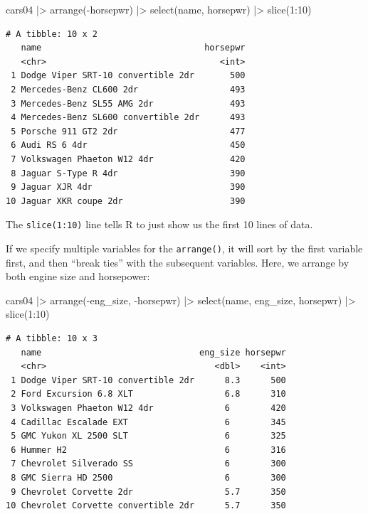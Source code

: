 \documentclass[
  letterpaper,
]{book}
\newenvironment{Shaded}{\begin{snugshade}}{\end{snugshade}}
\newcommand{\DecValTok}[1]{\textcolor[rgb]{0.68,0.00,0.00}{#1}}
\newcommand{\FunctionTok}[1]{\textcolor[rgb]{0.28,0.35,0.67}{#1}}
\newcommand{\NormalTok}[1]{\textcolor[rgb]{0.00,0.23,0.31}{#1}}
\newcommand{\SpecialCharTok}[1]{\textcolor[rgb]{0.37,0.37,0.37}{#1}}
\begin{document}
\begin{Shaded}
\begin{Highlighting}[]
\NormalTok{cars04 }\SpecialCharTok{|\textgreater{}} 
  \FunctionTok{arrange}\NormalTok{(}\SpecialCharTok{{-}}\NormalTok{horsepwr) }\SpecialCharTok{|\textgreater{}} 
  \FunctionTok{select}\NormalTok{(name, }
\NormalTok{         horsepwr) }\SpecialCharTok{|\textgreater{}} 
  \FunctionTok{slice}\NormalTok{(}\DecValTok{1}\SpecialCharTok{:}\DecValTok{10}\NormalTok{)}
\end{Highlighting}
\end{Shaded}

\begin{verbatim}
# A tibble: 10 x 2
   name                                horsepwr
   <chr>                                  <int>
 1 Dodge Viper SRT-10 convertible 2dr       500
 2 Mercedes-Benz CL600 2dr                  493
 3 Mercedes-Benz SL55 AMG 2dr               493
 4 Mercedes-Benz SL600 convertible 2dr      493
 5 Porsche 911 GT2 2dr                      477
 6 Audi RS 6 4dr                            450
 7 Volkswagen Phaeton W12 4dr               420
 8 Jaguar S-Type R 4dr                      390
 9 Jaguar XJR 4dr                           390
10 Jaguar XKR coupe 2dr                     390
\end{verbatim}

The \texttt{slice(1:10)} line tells R to just show us the first 10 lines
of data.

If we specify multiple variables for the \texttt{arrange()}, it will
sort by the first variable first, and then ``break ties'' with the
subsequent variables. Here, we arrange by both engine size and
horsepower:

\begin{Shaded}
\begin{Highlighting}[]
\NormalTok{cars04 }\SpecialCharTok{|\textgreater{}} 
  \FunctionTok{arrange}\NormalTok{(}\SpecialCharTok{{-}}\NormalTok{eng\_size, }
          \SpecialCharTok{{-}}\NormalTok{horsepwr) }\SpecialCharTok{|\textgreater{}} 
  \FunctionTok{select}\NormalTok{(name, }
\NormalTok{         eng\_size,}
\NormalTok{         horsepwr) }\SpecialCharTok{|\textgreater{}} 
  \FunctionTok{slice}\NormalTok{(}\DecValTok{1}\SpecialCharTok{:}\DecValTok{10}\NormalTok{)}
\end{Highlighting}
\end{Shaded}

\begin{verbatim}
# A tibble: 10 x 3
   name                               eng_size horsepwr
   <chr>                                 <dbl>    <int>
 1 Dodge Viper SRT-10 convertible 2dr      8.3      500
 2 Ford Excursion 6.8 XLT                  6.8      310
 3 Volkswagen Phaeton W12 4dr              6        420
 4 Cadillac Escalade EXT                   6        345
 5 GMC Yukon XL 2500 SLT                   6        325
 6 Hummer H2                               6        316
 7 Chevrolet Silverado SS                  6        300
 8 GMC Sierra HD 2500                      6        300
 9 Chevrolet Corvette 2dr                  5.7      350
10 Chevrolet Corvette convertible 2dr      5.7      350
\end{verbatim}
\end{document}
